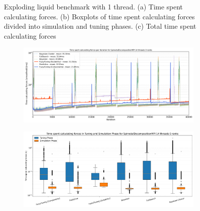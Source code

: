 \begin{figure}[H]
    \caption[Exploding liquid benchmark with 1 thread]{Exploding liquid benchmark with 1 thread. (a) Time spent calculating forces. (b) Boxplots of time spent calculating forces divided into simulation and tuning phases. (c) Total time spent calculating forces}
    \label{fig:explodingLiquid_1thread}
\end{figure}

\begin{figure}[H]
    \centering

    \begin{subfigure}[c]{\textwidth}
        \includegraphics[width=\columnwidth,trim={0cm 0 0cm 0.9cm},clip]{figures/Benchmark/SpinodalDecompositionMPI/SpinodalDecompositionMPI_timings_SpinodalDecompositionMPI_14_0.png}
        \caption{}
        \label{fig:spinodalTimings_14thread}
    \end{subfigure}


    \begin{subfigure}[c]{\textwidth}
        \includegraphics[width=\columnwidth,trim={0cm 0 0cm 1cm},clip]{figures/Benchmark/SpinodalDecompositionMPI/SpinodalDecompositionMPI_timings_boxplot_SpinodalDecompositionMPI_14_0.png}
        \caption{}
        \label{fig:spinodalBoxplot_14thread}
    \end{subfigure}


\end{figure}
